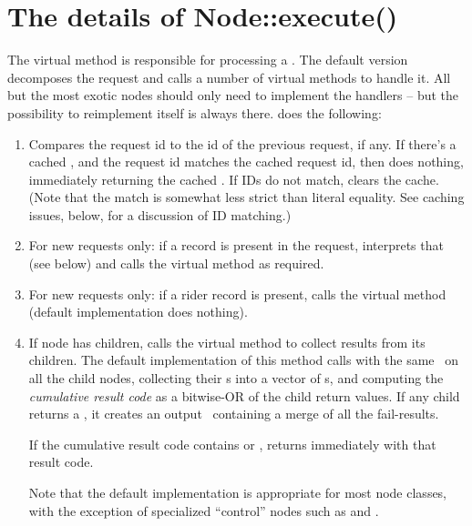 \documentclass[10pt]{article}
\begin{document}
\section{The details of Node::execute()}

  The virtual  method is responsible for processing a
  \Request. The default version decomposes the request and calls a number of
  virtual methods to handle it. All but the most exotic nodes should only need
  to implement the handlers -- but the possibility to reimplement
   itself is always there.  does the
  following:

  \begin{enumerate}
  
  \item Compares the request id to the id of the previous request, if any. If
    there's a cached \Result, and the request id matches the cached request id,
    then does nothing, immediately returning the cached \Result.  If IDs do not
    match, clears the cache. (Note that the match is somewhat less strict than
    literal equality. See caching issues, below, for a discussion of ID
    matching.)

  \item For new requests only: if a  record is present in the request, interprets that
    (see below) and calls the virtual  method as required. 

  \item For new requests only: if a rider record is present, calls the virtual
     method (default implementation does nothing).

  \item If node has children, calls the virtual  method to
    collect results from its children. The default implementation of this
    method calls  with the same \Request\ on all the child nodes,
    collecting their \Result{}s into a vector of s, and
    computing the {\em cumulative result code} as a bitwise-OR of the child
    return values. If any child returns a , it creates an output
    \Result\ containing a merge of all the fail-results.

    If the cumulative result code contains  or ,
     returns immediately with that result code. 
    
    Note that the default implementation is appropriate for most node classes,
    with the exception of specialized ``control'' nodes such as  and
    .


\end{enumerate}
\end{document}

